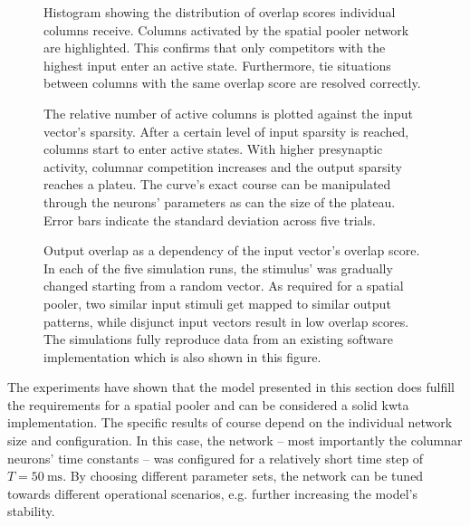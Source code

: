 \begin{figure}
	\begin{center}
		
	\end{center}
	\caption{Histogram showing the distribution of overlap scores individual columns receive. Columns activated by the spatial pooler network are highlighted. This confirms that only competitors with the highest input enter an active state. Furthermore, tie situations between columns with the same overlap score are resolved correctly.}
	\label{fig:spatial_pooler_activity}
\end{figure}

\begin{figure}
	\begin{center}
		
	\end{center}
	\caption{The relative number of active columns is plotted against the input vector's sparsity. After a certain level of input sparsity is reached, columns start to enter active states. With higher presynaptic activity, columnar competition increases and the output sparsity reaches a plateu. The curve's exact course can be manipulated through the neurons' parameters as can the size of the plateau. Error bars indicate the standard deviation across five trials.} 
	\label{fig:spatial_pooler_sparsity}
\end{figure}

\begin{figure}
	\begin{center}
		
	\end{center}
	\caption{Output overlap as a dependency of the input vector's overlap score. In each of the five simulation runs, the stimulus' was gradually changed starting from a random vector. As required for a spatial pooler, two similar input stimuli get mapped to similar output patterns, while disjunct input vectors result in low overlap scores. The simulations fully reproduce data from an existing software implementation which is also shown in this figure.}
	\label{fig:spatial_pooler_overlap}
\end{figure}


The experiments have shown that the model presented in this section does fulfill
the requirements for a spatial pooler and can be considered a solid \gls{kwta}
implementation. The specific results of course depend on the individual
network size and configuration. In this case, the network -- most importantly
the columnar neurons' time constants -- was configured for a relatively short
time step of $T = \SI{50}{\milli\second}$. By choosing different parameter sets,
the network can be tuned towards different operational scenarios, e.g. further
increasing the model's stability.

